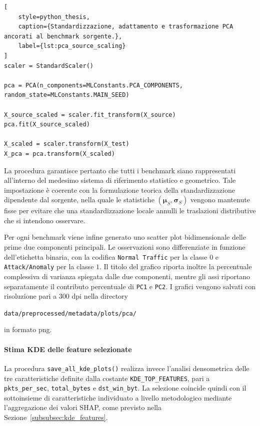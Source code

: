\begin{lstlisting}[
    style=python_thesis,
    caption={Standardizzazione, adattamento e trasformazione PCA ancorati al benchmark sorgente.},
    label={lst:pca_source_scaling}
]
scaler = StandardScaler()

pca = PCA(n_components=MLConstants.PCA_COMPONENTS, random_state=MLConstants.MAIN_SEED)

X_source_scaled = scaler.fit_transform(X_source)
pca.fit(X_source_scaled)

X_scaled = scaler.transform(X_test)
X_pca = pca.transform(X_scaled)
\end{lstlisting}

La procedura garantisce pertanto che tutti i benchmark siano rappresentati all'interno del medesimo sistema di riferimento statistico e geometrico. 
Tale impostazione è coerente con la formulazione teorica della standardizzazione dipendente dal sorgente, nella quale le statistiche $(\boldsymbol{\mu}_S,\boldsymbol{\sigma}_S)$ vengono mantenute fisse per evitare che una standardizzazione locale annulli le traslazioni distributive che si intendono osservare.

Per ogni benchmark viene infine generato uno scatter plot bidimensionale delle prime due componenti principali. 
Le osservazioni sono differenziate in funzione dell'etichetta binaria, con la codifica \texttt{Normal Traffic} per la classe $0$ e \texttt{Attack/Anomaly} per la classe $1$. 
Il titolo del grafico riporta inoltre la percentuale complessiva di varianza spiegata dalle due componenti, mentre gli assi riportano separatamente il contributo percentuale di \texttt{PC1} e \texttt{PC2}. 
I grafici vengono salvati con risoluzione pari a $300$ dpi nella directory 
\begin{center}
    \texttt{data/preprocessed/metadata/plots/pca/}
\end{center}
in formato png.

\paragraph{Stima KDE delle feature selezionate}

La procedura \texttt{save\_all\_kde\_plots()} realizza invece l'analisi densometrica delle tre caratteristiche definite dalla costante \texttt{KDE\_TOP\_FEATURES}, pari a \texttt{pkts\_per\_sec}, \texttt{total\_bytes} e \texttt{dst\_win\_byt}. 
La selezione coincide quindi con il sottoinsieme di caratteristiche individuato a livello metodologico mediante l'aggregazione dei valori SHAP, come previsto nella Sezione~\ref{subsubsec:kde_features}.

